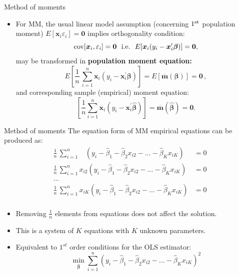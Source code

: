 \documentclass{beamer}
\begin{document}
\begin{frame}{Method of moments}
\begin{itemize}
\item For MM, the usual linear model assumption (concerning $1^{\textnormal{st}}$ population moment) $E[\bm{x}_i \varepsilon_i]=\bm{0}$ implies orthogonality condition: $$\textnormal{cov}[\bm{x}_i, \varepsilon_i] = \bm{0} \textnormal{~~i.e.~~}E[\bm{x}_i(y_i-\bm{x}_i^{\prime}\bm{\beta})]=\bm{0},$$ 
may be transformed in \textbf{population moment equation:}
$$
E \left[ \frac{1}{n} \, \sum_{i=1}^n \bm{x}_i (y_i - \bm{x}_i^{\prime}\bm{\beta}) \right] 
= E \left[ \overline{\bm{m}}(\bm{\beta}) \right] = \bm{0}\,,
$$
and corresponding sample (empirical) moment equation:
$$
\left[ \frac{1}{n} \sum_{i=1}^n \bm{x}_i (y_i - \bm{x}_i^{\prime}\hat{\bm{\beta}}) \right]
= \overline{\bm{m}}(\hat{\bm{\beta}}) = \bm{0}.
$$
\end{itemize}
\end{frame}
\begin{frame}{Method of moments}
The equation form of MM empirical equations can be produced as:
\medskip
\footnotesize
\begin{equation*}
\begin{aligned}
\frac{1}{n}\, \sum_{i=1}^n ~~~~\left( y_i - \hat{\beta}_1 - \hat{\beta}_2 x_{i2} - \dots - \hat{\beta}_K x_{iK} \right) &= 0\\
\frac{1}{n}\, \sum_{i=1}^n  x_{i2} \left( y_i - \hat{\beta}_1 - \hat{\beta}_2 x_{i2} - \dots - \hat{\beta}_K x_{iK} \right) &= 0\\
\dots &\\
\frac{1}{n}\, \sum_{i=1}^n x_{iK} \left( y_i - \hat{\beta}_1 - \hat{\beta}_2 x_{i2} - \dots - \hat{\beta}_K x_{iK} \right) &= 0\\
\end{aligned}
\end{equation*}
\medskip
\begin{itemize}
    \item Removing $\frac{1}{n}$ elements from equations does not affect the solution.
    \item This is a system of $K$ equations with $K$ unknown parameters.
    \item Equivalent to $1^{st}$ order conditions for the OLS estimator:
    $$ \underset{\hat{\bm{\beta}}}{\min}\sum_{i=1}^n \left( y_i - \hat{\beta}_1 - \hat{\beta}_2 x_{i2} - \dots - \hat{\beta}_K x_{iK} \right)^2$$
\end{itemize}
\end{frame}
\end{document}
